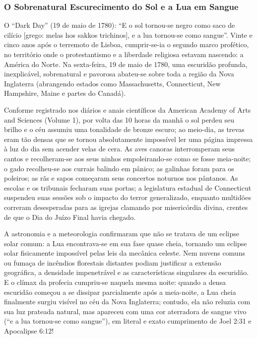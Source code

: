 \documentclass[11pt,a4paper,openany]{book}
\begin{document}
\subsubsection*{O Sobrenatural Escurecimento do Sol e a Lua em Sangue}
O ``Dark Day'' (19 de maio de 1780):
``E o sol tornou-se negro como saco de cilício [grego: melas hos sakkos trichinos], e a lua tornou-se como sangue''.
Vinte e cinco anos após o terremoto de Lisboa, cumprir-se-ia o segundo marco profético, no território onde o protestantismo e a liberdade religiosa estavam nascendo: a América do Norte.
Na sexta-feira, 19 de maio de 1780, uma escuridão profunda, inexplicável, sobrenatural e pavorosa abateu-se sobre toda a região da Nova Inglaterra (abrangendo estados como Massachusetts, Connecticut, New Hampshire, Maine e partes do Canadá).

Conforme registrado nos diários e anais científicos da American Academy of Arts and Sciences (Volume 1), por volta das 10 horas da manhã o sol perdeu seu brilho e o céu assumiu uma tonalidade de bronze escuro; ao meio-dia, as trevas eram tão densas que se tornou absolutamente impossível ler uma página impressa à luz do dia sem acender velas de cera. As aves canoras interromperam seus cantos e recolheram-se aos seus ninhos empoleirando-se como se fosse meia-noite; o gado recolheu-se aos currais balindo em pânico; as galinhas foram para os poleiros; as rãs e sapos começaram seus concertos noturnos nos pântanos. As escolas e os tribunais fecharam suas portas; a legislatura estadual de Connecticut suspendeu suas sessões sob o impacto do terror generalizado, enquanto multidões correram desesperadas para as igrejas clamando por misericórdia divina, crentes de que o Dia do Juízo Final havia chegado.

A astronomia e a meteorologia confirmaram que não se tratava de um eclipse solar comum: a Lua encontrava-se em sua fase quase cheia, tornando um eclipse solar fisicamente impossível pelas leis da mecânica celeste. Nem nuvens comuns ou fumaça de incêndios florestais distantes podiam justificar a extensão geográfica, a densidade impenetrável e as características singulares da escuridão.
E o clímax da profecia cumpriu-se naquela mesma noite: quando a densa escuridão começou a se dissipar parcialmente após a meia-noite, a Lua cheia finalmente surgiu visível no céu da Nova Inglaterra; contudo, ela não reluzia com sua luz prateada natural, mas apareceu com uma cor aterradora de sangue vivo (``e a lua tornou-se como sangue''), em literal e exato cumprimento de Joel 2:31 e Apocalipse 6:12!
\end{document}

